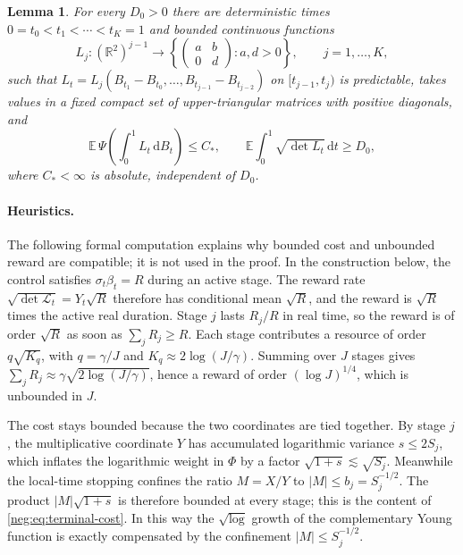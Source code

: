 \documentclass[11pt]{article}
\newtheorem{lemma}[lemma]{Lemma}
\theoremstyle{definition}
\theoremstyle{remark}
\numberwithin{equation}{section}
\begin{document}
\begin{lemma}
\label{neg:lem:Brownian}
For every $D_0>0$ there are deterministic times
$0=t_0<t_1<\cdots<t_K=1$ and bounded continuous functions
\[
 L_j:(\mathbb R^2)^{j-1}\longrightarrow
       \left\{\begin{pmatrix}a&b\\0&d\end{pmatrix}:a,d>0\right\},
 \qquad j=1,\dots,K,
\]
such that $L_t=L_j(B_{t_1}-B_{t_0},\dots,B_{t_{j-1}}-B_{t_{j-2}})$
on $[t_{j-1},t_j)$ is predictable, takes values in a fixed compact
set of upper-triangular matrices with positive diagonals, and
\begin{equation}\label{neg:eq:Brownian-claim}
 \mathbb E\,\Psi\!\left(\int_0^1L_t\,\mathrm dB_t\right)
 \le C_*,\qquad
 \mathbb E\int_0^1\sqrt{\det L_t}\,\mathrm dt\ge D_0,
\end{equation}
where $C_*<\infty$ is absolute, independent of $D_0$.
\end{lemma}

\paragraph{Heuristics.}
The following formal computation explains why bounded cost and
unbounded reward are compatible; it is not used in the proof. In the
construction below, the control satisfies $\sigma_t\beta_t=R$ during
an active stage. The reward rate $\sqrt{\det\mathcal L_t}
=Y_t\sqrt R$ therefore has conditional mean $\sqrt R$, and the reward is
$\sqrt R$ times the active real duration. Stage $j$ lasts $R_j/R$
in real time, so the reward is of order $\sqrt R$ as soon as
$\sum_jR_j\ge R$. Each stage contributes a resource of order
$q\sqrt{K_q}$, with $q=\gamma/J$ and $K_q\approx2\log(J/\gamma)$.
Summing over $J$ stages gives
$\sum_jR_j\approx\gamma\sqrt{2\log(J/\gamma)}$, hence a reward of order
$(\log J)^{1/4}$, which is unbounded in $J$.

The cost stays bounded because the two coordinates are tied together.
By stage $j$, the multiplicative coordinate $Y$ has accumulated
logarithmic variance $s\le2S_j$, which inflates the logarithmic weight
in $\Phi$ by a factor $\sqrt{1+s}\lesssim\sqrt{S_j}$. Meanwhile the
local-time stopping confines the ratio $M=X/Y$ to $|M|\le b_j=S_j^{-1/2}$.
The product $|M|\sqrt{1+s}$ is therefore bounded at every stage; this
is the content of \eqref{neg:eq:terminal-cost}. In this way the
$\sqrt{\log}$ growth of the complementary Young function is exactly
compensated by the confinement $|M|\le S_j^{-1/2}$.
\end{document}
